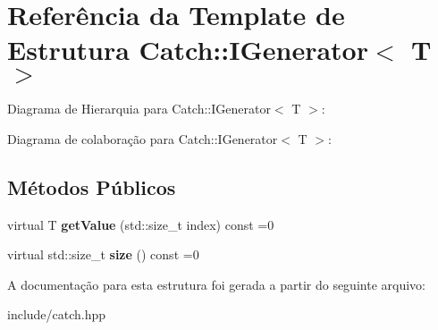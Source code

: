 \hypertarget{structCatch_1_1IGenerator}{}\section{Referência da Template de Estrutura Catch\+:\+:I\+Generator$<$ T $>$}
\label{structCatch_1_1IGenerator}


Diagrama de Hierarquia para Catch\+:\+:I\+Generator$<$ T $>$\+:


Diagrama de colaboração para Catch\+:\+:I\+Generator$<$ T $>$\+:
\subsection*{Métodos Públicos}
\begin{DoxyCompactItemize}
\item 
virtual T {\bfseries get\+Value} (std\+::size\+\_\+t index) const =0\hypertarget{structCatch_1_1IGenerator_ad69e937cb66dba3ed9429c42abf4fce3}{}\label{structCatch_1_1IGenerator_ad69e937cb66dba3ed9429c42abf4fce3}

\item 
virtual std\+::size\+\_\+t {\bfseries size} () const =0\hypertarget{structCatch_1_1IGenerator_a2e317253b03e838b6065ce69719a198e}{}\label{structCatch_1_1IGenerator_a2e317253b03e838b6065ce69719a198e}

\end{DoxyCompactItemize}


A documentação para esta estrutura foi gerada a partir do seguinte arquivo\+:\begin{DoxyCompactItemize}
\item 
include/catch.\+hpp\end{DoxyCompactItemize}
